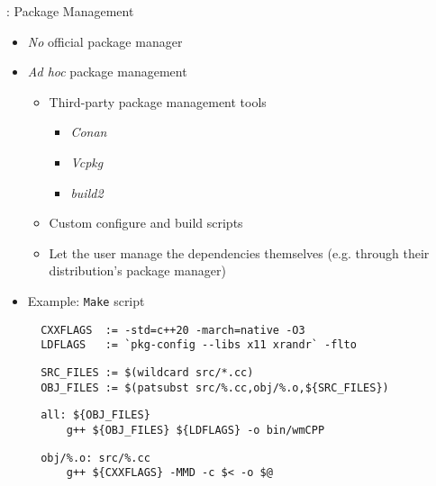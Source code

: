 \begin{frame}[c,fragile]{\underline{\cpp}: Package Management \hfill {\footnotesize \currentname}}

    \begin{itemize}

        \item \textit{No} official package manager\\

        \item \textit{Ad hoc} package management\\
            \begin{itemize}
                \item Third-party package management tools
                    \begin{itemize}
                        \item \textit{Conan}
                        \item \textit{Vcpkg}
                        \item \textit{build2}
                    \end{itemize}
                \item Custom configure and build scripts
                \item Let the user manage the dependencies themselves (e.g. through
                their distribution's package manager)
            \end{itemize}

        \item Example: \texttt{Make} script\\
\begin{verbatim}
  CXXFLAGS  := -std=c++20 -march=native -O3
  LDFLAGS   := `pkg-config --libs x11 xrandr` -flto
\end{verbatim}
\begin{verbatim}
  SRC_FILES := $(wildcard src/*.cc)
  OBJ_FILES := $(patsubst src/%.cc,obj/%.o,${SRC_FILES})
\end{verbatim}
\begin{verbatim}
  all: ${OBJ_FILES}
      g++ ${OBJ_FILES} ${LDFLAGS} -o bin/wmCPP
\end{verbatim}
\begin{verbatim}
  obj/%.o: src/%.cc
      g++ ${CXXFLAGS} -MMD -c $< -o $@
\end{verbatim}

    \end{itemize}

\end{frame}

